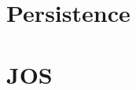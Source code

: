 \documentclass[12pt, letterpaper]{article}
\begin{document}
			
	\section{Persistence}


	\section{JOS}
\end{document}
